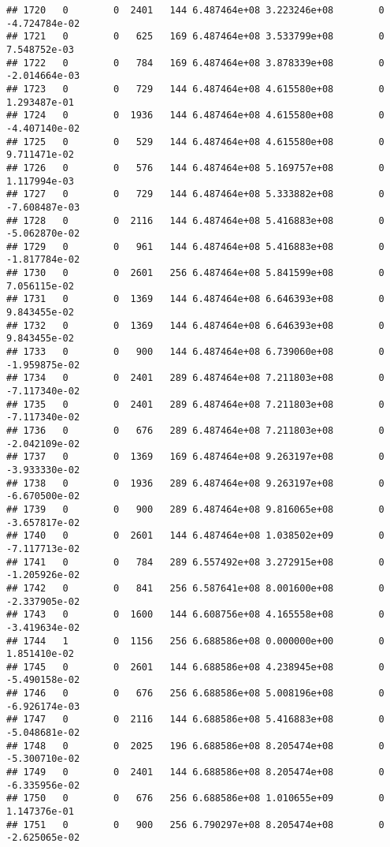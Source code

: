 \documentclass[
]{article}
\begin{document}
\begin{enumerate}
\begin{verbatim}
## 1720   0        0  2401   144 6.487464e+08 3.223246e+08        0 -4.724784e-02
## 1721   0        0   625   169 6.487464e+08 3.533799e+08        0  7.548752e-03
## 1722   0        0   784   169 6.487464e+08 3.878339e+08        0 -2.014664e-03
## 1723   0        0   729   144 6.487464e+08 4.615580e+08        0  1.293487e-01
## 1724   0        0  1936   144 6.487464e+08 4.615580e+08        0 -4.407140e-02
## 1725   0        0   529   144 6.487464e+08 4.615580e+08        0  9.711471e-02
## 1726   0        0   576   144 6.487464e+08 5.169757e+08        0  1.117994e-03
## 1727   0        0   729   144 6.487464e+08 5.333882e+08        0 -7.608487e-03
## 1728   0        0  2116   144 6.487464e+08 5.416883e+08        0 -5.062870e-02
## 1729   0        0   961   144 6.487464e+08 5.416883e+08        0 -1.817784e-02
## 1730   0        0  2601   256 6.487464e+08 5.841599e+08        0  7.056115e-02
## 1731   0        0  1369   144 6.487464e+08 6.646393e+08        0  9.843455e-02
## 1732   0        0  1369   144 6.487464e+08 6.646393e+08        0  9.843455e-02
## 1733   0        0   900   144 6.487464e+08 6.739060e+08        0 -1.959875e-02
## 1734   0        0  2401   289 6.487464e+08 7.211803e+08        0 -7.117340e-02
## 1735   0        0  2401   289 6.487464e+08 7.211803e+08        0 -7.117340e-02
## 1736   0        0   676   289 6.487464e+08 7.211803e+08        0 -2.042109e-02
## 1737   0        0  1369   169 6.487464e+08 9.263197e+08        0 -3.933330e-02
## 1738   0        0  1936   289 6.487464e+08 9.263197e+08        0 -6.670500e-02
## 1739   0        0   900   289 6.487464e+08 9.816065e+08        0 -3.657817e-02
## 1740   0        0  2601   144 6.487464e+08 1.038502e+09        0 -7.117713e-02
## 1741   0        0   784   289 6.557492e+08 3.272915e+08        0 -1.205926e-02
## 1742   0        0   841   256 6.587641e+08 8.001600e+08        0 -2.337905e-02
## 1743   0        0  1600   144 6.608756e+08 4.165558e+08        0 -3.419634e-02
## 1744   1        0  1156   256 6.688586e+08 0.000000e+00        0  1.851410e-02
## 1745   0        0  2601   144 6.688586e+08 4.238945e+08        0 -5.490158e-02
## 1746   0        0   676   256 6.688586e+08 5.008196e+08        0 -6.926174e-03
## 1747   0        0  2116   144 6.688586e+08 5.416883e+08        0 -5.048681e-02
## 1748   0        0  2025   196 6.688586e+08 8.205474e+08        0 -5.300710e-02
## 1749   0        0  2401   144 6.688586e+08 8.205474e+08        0 -6.335956e-02
## 1750   0        0   676   256 6.688586e+08 1.010655e+09        0  1.147376e-01
## 1751   0        0   900   256 6.790297e+08 8.205474e+08        0 -2.625065e-02

\end{verbatim}
\end{enumerate}
\end{document}
